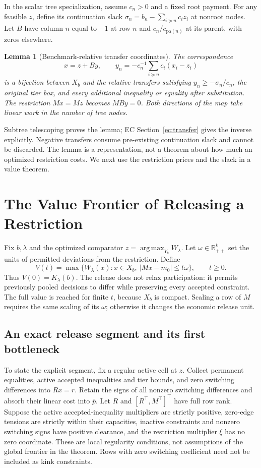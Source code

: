 \documentclass[11pt,letterpaper]{article}
\newtheorem{lemma}[theorem]{Lemma}
\theoremstyle{definition}\newtheorem{assumption}[theorem]{Assumption}
\newcommand{\R}{\mathbb R}\newcommand{\E}{\mathbb E}
\newcommand{\argmax}{\operatorname*{arg\,max}}
\begin{document}
In the scalar tree specialization, assume $c_n>0$ and a fixed root payment. For any feasible $z$, define its continuation slack $\sigma_n=b_n-\sum_{i\succeq n}c_i z_i$ at nonroot nodes. Let $B$ have column $n$ equal to $-1$ at row $n$ and $c_n/c_{\mathrm{pa}(n)}$ at its parent, with zeros elsewhere.
\begin{lemma}[Benchmark-relative transfer coordinates]\label{lem:transfers}
The correspondence
\begin{equation}\label{eq:transfers}
 x=z+By,\qquad y_n=-c_n^{-1}\sum_{i\succeq n}c_i(x_i-z_i)
\end{equation}
is a bijection between $X_b$ and the relative transfers satisfying
$y_n\geq-\sigma_n/c_n$, the original tier box, and every additional inequality or equality after substitution. The restriction $Mx=Mz$ becomes $MBy=0$. Both directions of the map take linear work in the number of tree nodes.
\end{lemma}
Subtree telescoping proves the lemma; EC Section~\ref{ec:transfer} gives the inverse explicitly. Negative transfers consume pre-existing continuation slack and cannot be discarded. The lemma is a representation, not a theorem about how much an optimized restriction costs. We next use the restriction prices and the slack in a value theorem.

\section{The Value Frontier of Releasing a Restriction}\label{sec:release}
Fix $b,\lambda$ and the optimized comparator $z=\argmax_{Y_b}W_\lambda$. Let $\omega\in\R^k_{++}$ set the units of permitted deviations from the restriction. Define
\begin{equation}\label{eq:release}
 V(t)=\max\{W_\lambda(x):x\in X_b,\ |Mx-m_0|\leq t\omega\},\qquad t\geq0.
\end{equation}
Thus $V(0)=K_\lambda(b)$. The release does not relax participation: it permits previously pooled decisions to differ while preserving every accepted constraint. The full value is reached for finite $t$, because $X_b$ is compact. Scaling a row of $M$ requires the same scaling of its $\omega$; otherwise it changes the economic release unit.

\subsection{An exact release segment and its first bottleneck}
To state the explicit segment, fix a regular active cell at $z$. Collect permanent equalities, active accepted inequalities and tier bounds, and zero switching differences into $Rx=r$. Retain the signs of all nonzero switching differences and absorb their linear cost into $\bar p$. Let $R$ and $[R^\top,M^\top]^\top$ have full row rank. Suppose the active accepted-inequality multipliers are strictly positive, zero-edge tensions are strictly within their capacities, inactive constraints and nonzero switching signs have positive clearance, and the restriction multiplier $\xi$ has no zero coordinate. These are local regularity conditions, not assumptions of the global frontier in the theorem. Rows with zero switching coefficient need not be included as kink constraints.
\end{document}
